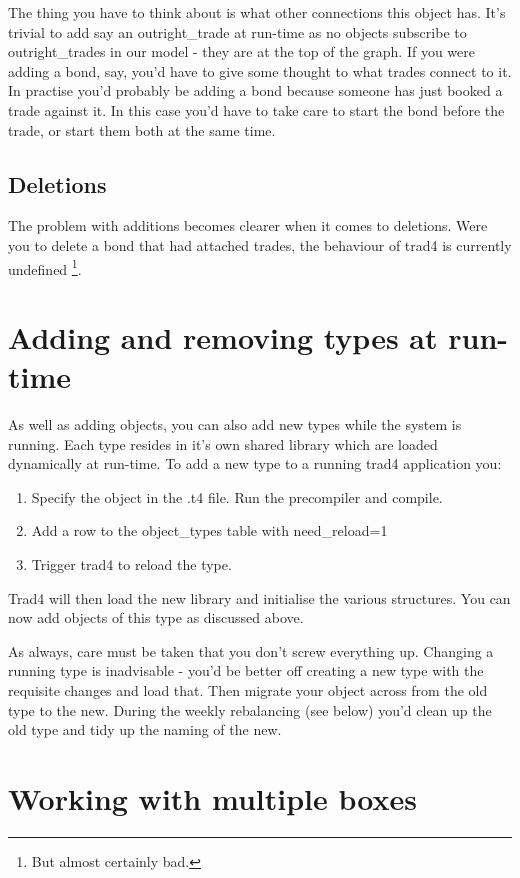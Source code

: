 \documentclass{report}
\begin{document}
The thing you have to think about is what other connections this object has. It's trivial to add say an outright_trade at run-time as no objects subscribe to outright_trades in our model - they are at the top of the graph. If you were adding a bond, say, you'd have to give some thought to what trades connect to it.  In practise you'd probably be adding a bond because someone has just booked a trade against it. In this case you'd have to take care to start the bond before the trade, or start them both at the same time.

\subsection{Deletions}

The problem with additions becomes clearer when it comes to deletions. Were you to delete a bond that had attached trades, the behaviour of trad4 is currently undefined \footnote{But almost certainly bad.}.

\section{Adding and removing types at run-time}

As well as adding objects, you can also add new types while the system is running. Each type resides in it's own shared library which are loaded dynamically at run-time. To add a new type to a running trad4 application you:

\begin{enumerate}
\item Specify the object in the .t4 file. Run the precompiler and compile.
\item Add a row to the object_types table with need_reload=1
\item Trigger trad4 to reload the type.
\end{enumerate}

Trad4 will then load the new library and initialise the various structures. You can now add objects of this type as discussed above.

As always, care must be taken that you don't screw everything up. Changing a running type is inadvisable - you'd be better off creating a new type with the requisite changes and load that. Then migrate your object across from the old type to the new. During the weekly rebalancing (see below) you'd clean up the old type and tidy up the naming of the new.

\section{Working with multiple boxes}
\end{document}
